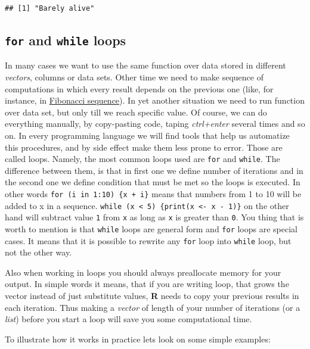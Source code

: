 \documentclass[]{book}
\theoremstyle{definition}
\theoremstyle{definition}
\theoremstyle{definition}
\theoremstyle{remark}
\begin{document}
\begin{verbatim}
## [1] "Barely alive"
\end{verbatim}

\subsection{\texorpdfstring{\texttt{for} and \texttt{while}
loops}{for and while loops}}\label{for-and-while-loops}

In many cases we want to use the same function over data stored in
different \emph{vectors}, columns or data sets. Other time we need to
make sequence of computations in which every result depends on the
previous one (like, for instance, in
\href{https://en.wikipedia.org/wiki/Fibonacci_number}{Fibonacci
sequence}). In yet another situation we need to run function over data
set, but only till we reach specific value. Of course, we can do
everything manually, by copy-pasting code, taping \emph{ctrl+enter}
several times and so on. In every programming language we will find
tools that help us automatize this procedures, and by side effect make
them less prone to error. Those are called loops. Namely, the most
common loops used are \texttt{for} and \texttt{while}. The difference
between them, is that in first one we define number of iterations and in
the second one we define condition that must be met so the loops is
executed. In other words \texttt{for\ (i\ in\ 1:10)\ \{x\ +\ i\}} means
that numbers from 1 to 10 will be added to x in a sequence.
\texttt{while\ (x\ \textless{}\ 5)\ \{print(x\ \textless{}-\ x\ -\ 1)\}}
on the other hand will subtract value \texttt{1} from \texttt{x} as long
as \texttt{x} is greater than \texttt{0}. You thing that is worth to
mention is that \texttt{while} loops are general form and \texttt{for}
loops are special cases. It means that it is possible to rewrite any
\texttt{for} loop into \texttt{while} loop, but not the other way.

Also when working in loops you should always preallocate memory for your
output. In simple words it means, that if you are writing loop, that
grows the vector instead of just substitute values, \textbf{R} needs to
copy your previous results in each iteration. Thus making a
\emph{vector} of length of your number of iterations (or a \emph{list})
before you start a loop will save you some computational time.

To illustrate how it works in practice lets look on some simple
examples:
\end{document}
